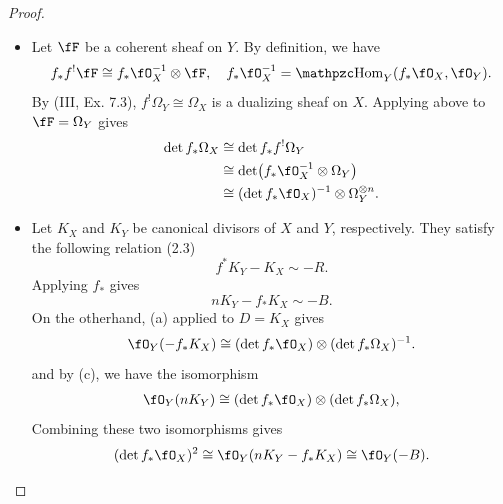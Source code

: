 \documentclass[a4paper]{article}
\begin{document}
\begin{enumerate} [label=\textbf{\arabic*.}, leftmargin=0em]
\begin{proof}
\begin{itemize} [leftmargin=0cm]
            \item[(c)] Let $\fF$ be a coherent sheaf on $Y$.
                  By definition, we have
                  \begin{equation*}
                    f_*f^!\fF \cong f_*\fO_X^{-1} \otimes \fF, \quad f_*\fO_X^{-1} = \rHom_Y(f_*\fO_X, \fO_Y).
                  \end{equation*}
                  By (III, Ex. 7.3), $f^! \Omega_Y \cong \Omega_X$ is a dualizing sheaf on $X$.
                  Applying above to $\fF = \Omega_Y$ gives
                  \begin{align*}
                    \det f_*\Omega_X & \cong \det f_*f^!\Omega_Y                                \\
                                     & \cong \det(f_*\fO_X^{-1} \otimes \Omega_Y)               \\
                                     & \cong (\det f_*\fO_X)^{-1} \otimes \Omega_Y^{\otimes n}.
                  \end{align*}

            \item[(d)] Let $K_X$ and $K_Y$ be canonical divisors of $X$ and $Y$, respectively.
                  They satisfy the following relation (2.3)
                  \begin{equation*}
                    f^*K_Y - K_X \sim -R.
                  \end{equation*}
                  Applying $f_*$ gives
                  \begin{equation*}
                    nK_Y - f_*K_X \sim - B.
                  \end{equation*}
                  On the otherhand, (a) applied to $D = K_X$ gives
                  \begin{equation*}
                    \fO_Y(-f_*K_X) \cong (\det f_*\fO_X) \otimes (\det f_*\Omega_X)^{-1}.
                  \end{equation*}
                  and by (c), we have the isomorphism
                  \begin{align*}
                    \fO_Y(nK_Y) \cong (\det f_*\fO_X) \otimes (\det f_*\Omega_X),
                  \end{align*}
                  Combining these two isomorphisms gives
                  \begin{equation*}
                    (\det f_*\fO_X)^2 \cong \fO_Y(nK_Y - f_*K_X) \cong \fO_Y(-B).
                  \end{equation*}
          \end{itemize}
        \end{proof}


\end{enumerate}
\end{document}
